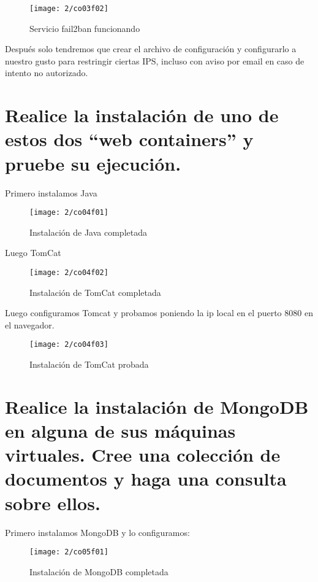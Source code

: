 \begin{figure}[H]
	\centering
	\texttt{[image: 2/co03f02]}
	\caption{Servicio fail2ban funcionando}
	\label{fig:f05}
\end{figure}


Después solo tendremos que crear el archivo de configuración y configurarlo a nuestro gusto para restringir ciertas IPS, incluso con aviso por email en caso de intento no autorizado. \cite{c03} \\

\clearpage
\section{Realice la instalación de uno de estos dos “web containers” y pruebe su ejecución.}

Primero instalamos Java
\begin{figure}[H]
	\centering
	\texttt{[image: 2/co04f01]}
	\caption{Instalación de Java completada}
	\label{fig:f06}
\end{figure}
Luego TomCat 
\begin{figure}[H]
	\centering
	\texttt{[image: 2/co04f02]}
	\caption{Instalación de TomCat completada}
	\label{fig:f07}
\end{figure}

Luego configuramos Tomcat \cite{c04} y probamos poniendo la ip local en el puerto 8080 en el navegador.
\begin{figure}[H]
	\centering
	\texttt{[image: 2/co04f03]}
	\caption{Instalación de TomCat probada}
	\label{fig:f08}
\end{figure}


\section{Realice la instalación de MongoDB en alguna de sus máquinas virtuales. Cree una colección de documentos y haga una consulta sobre ellos.}

Primero instalamos MongoDB y lo configuramos: \cite{c05} \\
\begin{figure}[H]
	\centering
	\texttt{[image: 2/co05f01]}
	\caption{Instalación de MongoDB completada}
	\label{fig:f09}
\end{figure}

